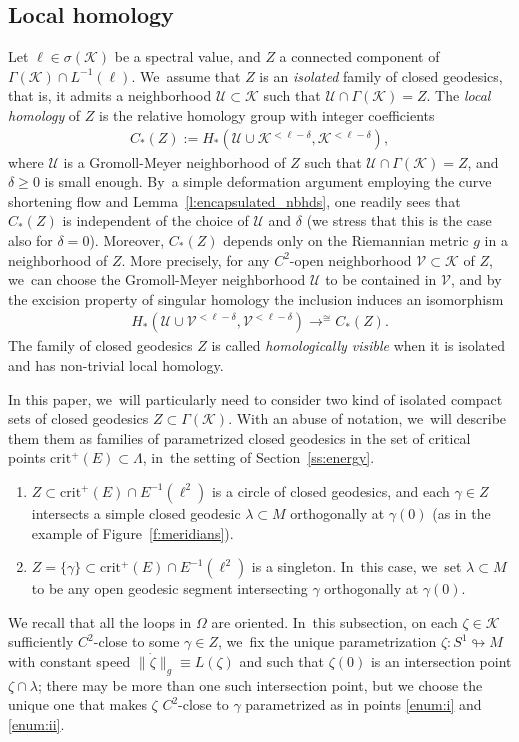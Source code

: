 \documentclass[11pt]{article}
\newcommand{\KK}{\mathcal{K}}
\newcommand{\UU}{\mathcal{U}}
\newcommand{\VV}{\mathcal{V}}
\newcommand{\crit}{\mathrm{crit}}
\DeclareMathOperator*{\toup}{\longrightarrow}
\let\ttoup\toup
\theoremstyle{plain}
\theoremstyle{definition}
\begin{document}
\subsection{Local homology}\label{ss:hom_visible}
Let $\ell\in\sigma(\KK)$ be a spectral value, and $Z$ a connected component of $\Gamma(\KK)\cap L^{-1}(\ell)$. We~assume that $Z$ is an \emph{isolated} family of closed geodesics, that is, it admits a neighborhood $\UU\subset\KK$ such that $\UU\cap\Gamma(\KK)=Z$.
The \emph{local homology} of $Z$ is the relative homology group with integer coefficients
\begin{align*}
C_*(Z)
:=
H_*(\UU\cup\KK{}^{<\ell-\delta},\KK{}^{<\ell-\delta}),
\end{align*}
where $\UU$ is a Gromoll-Meyer neighborhood of $Z$ such that $\UU\cap\Gamma(\KK)=Z$, and $\delta\geq0$ is small enough. By~a simple deformation argument employing the curve shortening flow and Lemma~\ref{l:encapsulated_nbhds}, one readily sees that $C_*(Z)$ is independent of the choice of $\UU$ and $\delta$ (we stress that this is the case also for $\delta=0$). Moreover, $C_*(Z)$ depends only on the Riemannian metric $g$ in a neighborhood of $Z$. More precisely, for any $C^2$-open neighborhood $\VV\subset\KK$ of $Z$, we~can choose the Gromoll-Meyer neighborhood $\UU$ to be contained in $\VV$, and by the excision property of singular homology the inclusion induces an isomorphism
\begin{align*}
H_*(\UU\cup\VV^{<\ell-\delta},\VV^{<\ell-\delta})
\ttoup^{\cong}
C_*(Z).
\end{align*}
The family of closed geodesics $Z$ is called \emph{homologically visible} when it is isolated and has non-trivial local homology.

In this paper, we~will particularly need to consider two kind of isolated compact sets of closed geodesics $Z\subset\Gamma(\KK)$. With an abuse of notation, we~will describe them them as families of parametrized closed geodesics in the set of critical points $\crit^+(E)\subset\Lambda$, in~the setting of Section~\ref{ss:energy}.

\begin{enumerate}
\item\label{enum:i}
$Z\subset\crit^+(E)\cap E^{-1}(\ell^2)$ is a circle of closed geodesics, and each $\gamma\in Z$ intersects a simple closed geodesic $\lambda\subset M$ orthogonally at $\gamma(0)$ (as in the example of Figure~\ref{f:meridians}).

\item\label{enum:ii}
$Z=\{\gamma\}\subset\crit^+(E)\cap E^{-1}(\ell^2)$ is a singleton. In~this case, we~set $\lambda\subset M$ to be any open geodesic segment intersecting $\gamma$ orthogonally at $\gamma(0)$.
\end{enumerate}
We recall that all the loops in $\Omega$ are oriented. In~this subsection, on each $\zeta\in\KK$ sufficiently $C^2$-close to some $\gamma\in Z$, we~fix the unique parametrization $\zeta:S^1\looparrowright M$ with constant speed $\|\dot\zeta\|_g\equiv L(\zeta)$ and such that $\zeta(0)$ is an intersection point $\zeta\cap\lambda$; there may be more than one such intersection point, but we choose the unique one that makes $\zeta$ $C^2$-close to $\gamma$ parametrized as in points \eqref{enum:i} and \eqref{enum:ii}.
\end{document}
